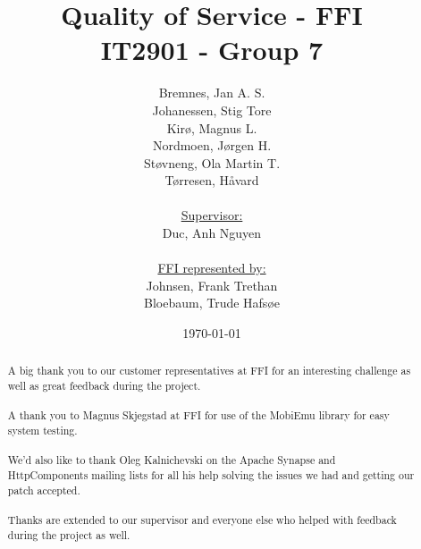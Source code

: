 \documentclass[titlepage, a4paper]{article}
\title{
    Quality of Service - FFI \\
    IT2901 - Group 7  \\ 
}
\author{
    Bremnes, Jan A. S.\\
    Johanessen, Stig Tore\\
    Kirø, Magnus L.\\
    Nordmoen, Jørgen H.\\
    Støvneng, Ola Martin T.\\
    Tørresen, Håvard\\
    \\
    \underline{Supervisor:}\\
    Duc, Anh Nguyen\\
    \\
    \underline{FFI represented by:}\\
    Johnsen, Frank Trethan \\
    Bloebaum, Trude Hafsøe
}
\date{\today}
\begin{document}
\maketitle
\begin{abstract}\label{abstract}
    
\end{abstract}
\newpage
\renewcommand{\abstractname}{Acknowledgements}
\begin{abstract}\label{acknowledgements}
    A big thank you to our customer representatives at FFI for an interesting challenge as well as great feedback during the project.
    \\\\
    A thank you to Magnus Skjegstad at FFI for use of the  MobiEmu library for easy system testing.
    \\\\
    We’d also like to thank Oleg Kalnichevski on the Apache Synapse and HttpComponents mailing lists for all his help solving the issues we had and getting our patch accepted.
    \\\\
    Thanks are extended to our supervisor and everyone else who helped with feedback during the project as well.
\end{abstract}
\newpage

\tableofcontents
\listoffigures
\listoflistings












\appendix










\label{Glossary}
\printglossaries





\end{document}
